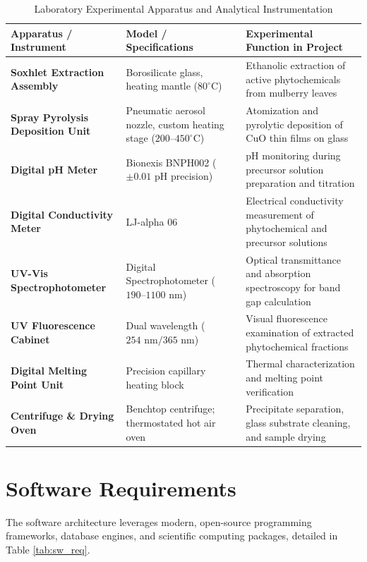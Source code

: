 \documentclass[12pt,a4paper,oneside]{report}
\begin{document}
{{{\begin{table}[h!]
\centering
\caption{Laboratory Experimental Apparatus and Analytical Instrumentation}
\label{tab:lab_apparatus_req}
\begin{tabular}{|p{4.2cm}|p{4.8cm}|p{5.5cm}|}
\hline
\textbf{Apparatus / Instrument} & \textbf{Model / Specifications} & \textbf{Experimental Function in Project} \\
\hline
\textbf{Soxhlet Extraction Assembly} & Borosilicate glass, heating mantle ($80^\circ\text{C}$) & Ethanolic extraction of active phytochemicals from mulberry leaves \\
\hline
\textbf{Spray Pyrolysis Deposition Unit} & Pneumatic aerosol nozzle, custom heating stage ($200\text{--}450^\circ\text{C}$) & Atomization and pyrolytic deposition of $\text{CuO}$ thin films on glass \\
\hline
\textbf{Digital pH Meter} & Bionexis BNPH002 ($\pm 0.01\text{ pH}$ precision) & pH monitoring during precursor solution preparation and titration \\
\hline
\textbf{Digital Conductivity Meter} & LJ-alpha 06 & Electrical conductivity measurement of phytochemical and precursor solutions \\
\hline
\textbf{UV-Vis Spectrophotometer} & Digital Spectrophotometer ($190\text{--}1100\text{ nm}$) & Optical transmittance and absorption spectroscopy for band gap calculation \\
\hline
\textbf{UV Fluorescence Cabinet} & Dual wavelength ($254\text{ nm} / 365\text{ nm}$) & Visual fluorescence examination of extracted phytochemical fractions \\
\hline
\textbf{Digital Melting Point Unit} & Precision capillary heating block & Thermal characterization and melting point verification \\
\hline
\textbf{Centrifuge \& Drying Oven} & Benchtop centrifuge; thermostated hot air oven & Precipitate separation, glass substrate cleaning, and sample drying \\
\hline
\end{tabular}
\end{table}

\section{Software Requirements}

The software architecture leverages modern, open-source programming frameworks, database engines, and scientific computing packages, detailed in Table \ref{tab:sw_req}.

}}}
\end{document}
